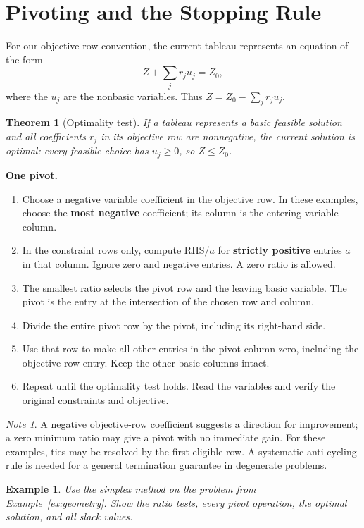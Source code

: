 \documentclass{article}
\theoremstyle{plain}
\newtheorem{theorem}{Theorem}[section]
\newtheorem{example}{Example}[section]
\theoremstyle{definition}
\theoremstyle{remark}
\newtheorem*{note}{Note}
\newcommand{\RHS}{\mathrm{RHS}}
\begin{document}
\section{Pivoting and the Stopping Rule}
For our objective-row convention, the current tableau represents an equation of the form
\[
Z+\sum_j r_j u_j=Z_0,
\]
where the $u_j$ are the nonbasic variables. Thus $Z=Z_0-\sum_jr_ju_j$.
\begin{theorem}[Optimality test]
If a tableau represents a basic feasible solution and all coefficients $r_j$ in its objective row are nonnegative, the current solution is optimal: every feasible choice has $u_j\ge0$, so $Z\le Z_0$.
\end{theorem}
\textbf{One pivot.}
\begin{enumerate}
\item Choose a negative variable coefficient in the objective row. In these examples, choose the \textbf{most negative} coefficient; its column is the entering-variable column.
\item In the constraint rows only, compute $\RHS/a$ for \textbf{strictly positive} entries $a$ in that column. Ignore zero and negative entries. A zero ratio is allowed.
\item The smallest ratio selects the pivot row and the leaving basic variable. The pivot is the entry at the intersection of the chosen row and column.
\item Divide the entire pivot row by the pivot, including its right-hand side.
\item Use that row to make all other entries in the pivot column zero, including the objective-row entry. Keep the other basic columns intact.
\item Repeat until the optimality test holds. Read the variables and verify the original constraints and objective.
\end{enumerate}
\begin{note}
A negative objective-row coefficient suggests a direction for improvement; a zero minimum ratio may give a pivot with no immediate gain. For these examples, ties may be resolved by the first eligible row. A systematic anti-cycling rule is needed for a general termination guarantee in degenerate problems.
\end{note}
\begin{example}\label{ex:firstsimplex}
Use the simplex method on the problem from Example~\ref{ex:geometry}. Show the ratio tests, every pivot operation, the optimal solution, and all slack values.
\end{example}
\end{document}
